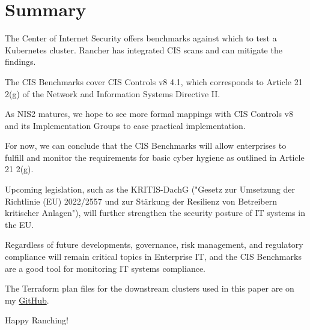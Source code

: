 %
%

\pagebreak
\section{Summary}

\onehalfspacing

The Center of Internet Security offers benchmarks against which to test a Kubernetes cluster. Rancher has integrated CIS scans and can mitigate the findings.

The CIS Benchmarks cover CIS Controls v8 4.1, which corresponds to Article 21 2(g) of the Network and Information Systems Directive II.

As NIS2 matures, we hope to see more formal mappings with CIS Controls v8 and its Implementation Groups to ease practical implementation.

For now, we can conclude that the CIS Benchmarks will allow enterprises to fulfill and monitor the requirements for basic cyber hygiene as outlined in Article 21 2(g).

Upcoming legislation, such as the KRITIS-DachG ("Gesetz zur Umsetzung der Richtlinie (EU) 2022/2557 und zur Stärkung der Resilienz von Betreibern kritischer Anlagen"), will further strengthen the security posture of IT systems in the EU.

Regardless of future developments, governance, risk management, and regulatory compliance will remain critical topics in Enterprise IT, and the CIS Benchmarks are a good tool for monitoring IT systems compliance.

The Terraform plan files for the downstream clusters used in this paper are on my \href{https://github.com/chfrank-cgn/Rancher}{GitHub}.

Happy Ranching!
